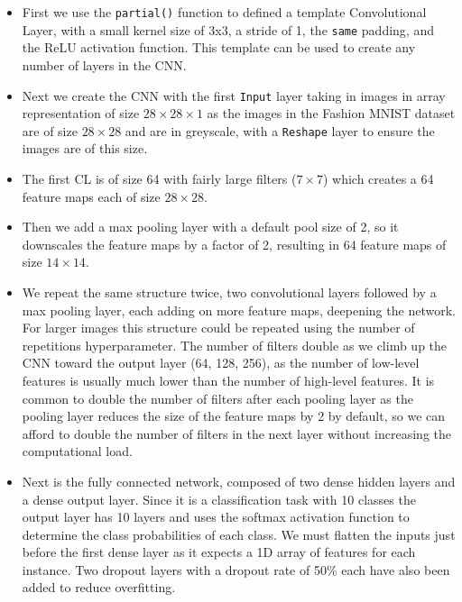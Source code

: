 \documentclass[12pt letter]{report}
\begin{document}
    
\begin{itemize}
\item
  First we use the \texttt{partial()} function to defined a template
  Convolutional Layer, with a small kernel size of 3x3, a stride of 1,
  the \texttt{same} padding, and the ReLU activation function. This
  template can be used to create any number of layers in the CNN.
\item
  Next we create the CNN with the first \texttt{Input} layer taking in
  images in array representation of size \(28\times 28\times 1\) as the
  images in the Fashion MNIST dataset are of size \(28\times 28\) and
  are in greyscale, with a \texttt{Reshape} layer to ensure the images
  are of this size.
\item
  The first CL is of size 64 with fairly large filters (\(7\times 7\))
  which creates a 64 feature maps each of size \(28\times 28\).
\item
  Then we add a max pooling layer with a default pool size of 2, so it
  downscales the feature maps by a factor of 2, resulting in 64 feature
  maps of size \(14\times 14\).
\item
  We repeat the same structure twice, two convolutional layers followed
  by a max pooling layer, each adding on more feature maps, deepening
  the network. For larger images this structure could be repeated using
  the number of repetitions hyperparameter. The number of filters double
  as we climb up the CNN toward the output layer (64, 128, 256), as the
  number of low-level features is usually much lower than the number of
  high-level features. It is common to double the number of filters
  after each pooling layer as the pooling layer reduces the size of the
  feature maps by 2 by default, so we can afford to double the number of
  filters in the next layer without increasing the computational load.
\item
  Next is the fully connected network, composed of two dense hidden
  layers and a dense output layer. Since it is a classification task
  with 10 classes the output layer has 10 layers and uses the softmax
  activation function to determine the class probabilities of each
  class. We must flatten the inputs just before the first dense layer as
  it expects a 1D array of features for each instance. Two dropout
  layers with a dropout rate of 50\% each have also been added to reduce
  overfitting.
\end{itemize}
\end{document}
